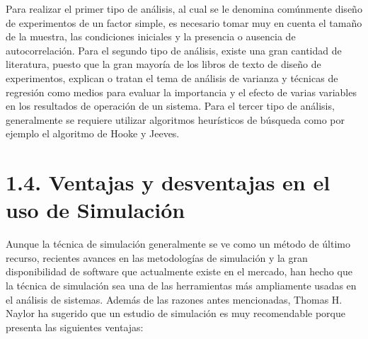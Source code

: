 \documentclass[11pt,letterpaper]{report}
\begin{document}
Para realizar el primer tipo de análisis, al cual se le denomina
comúnmente diseño de experimentos de un factor simple, es necesario
tomar muy en cuenta el tamaño de la muestra, las condiciones iniciales y
la presencia o ausencia de autocorrelación. Para el segundo tipo de
análisis, existe una gran cantidad de literatura, puesto que la gran
mayoría de los libros de texto de diseño de experimentos, explican o
tratan el tema de análisis de varianza y técnicas de regresión como
medios para evaluar la importancia y el efecto de varias variables en
los resultados de operación de un sistema. Para el tercer tipo de
análisis, generalmente se requiere utilizar algoritmos heurísticos de
búsqueda como por ejemplo el algoritmo de Hooke y Jeeves.

\section*{1.4. Ventajas y desventajas en el uso de Simulación}

Aunque la técnica de simulación generalmente se ve como un método de
último recurso, recientes avances en las metodologías de simulación y la
gran disponibilidad de software que actualmente existe en el mercado,
han hecho que la técnica de simulación sea una de las herramientas más
ampliamente usadas en el análisis de sistemas. Además de las razones
antes mencionadas, Thomas H. Naylor ha sugerido que un estudio de
simulación es muy recomendable porque presenta las siguientes ventajas:
\end{document}
